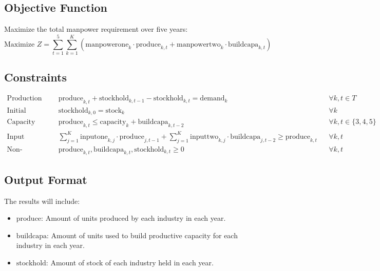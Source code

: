 \documentclass{article}
\begin{document}
\subsection*{Objective Function}
Maximize the total manpower requirement over five years:
\[
\text{Maximize } Z = \sum_{t=1}^{5} \sum_{k=1}^{K} \left( \text{manpowerone}_{k} \cdot \text{produce}_{k,t} + \text{manpowertwo}_{k} \cdot \text{buildcapa}_{k,t} \right)
\]

\subsection*{Constraints}
\begin{align*}
\text{Production Constraints:} & \quad \text{produce}_{k,t} + \text{stockhold}_{k,t-1} - \text{stockhold}_{k,t} = \text{demand}_{k} && \forall k, t \in T \\
\text{Initial Stock:} & \quad \text{stockhold}_{k,0} = \text{stock}_{k} && \forall k \\
\text{Capacity Constraints:} & \quad \text{produce}_{k,t} \leq \text{capacity}_{k} + \text{buildcapa}_{k,t-2} && \forall k, t \in \{3, 4, 5\} \\
\text{Input Constraints:} & \quad \sum_{j=1}^{K} \text{inputone}_{k,j} \cdot \text{produce}_{j,t-1} + \sum_{j=1}^{K} \text{inputtwo}_{k,j} \cdot \text{buildcapa}_{j,t-2} \geq \text{produce}_{k,t} && \forall k, t \\
\text{Non-negativity Constraints:} & \quad \text{produce}_{k,t}, \text{buildcapa}_{k,t}, \text{stockhold}_{k,t} \geq 0 && \forall k, t
\end{align*}

\subsection*{Output Format}
The results will include:
\begin{itemize}
    \item \( \text{produce} \): Amount of units produced by each industry in each year.
    \item \( \text{buildcapa} \): Amount of units used to build productive capacity for each industry in each year.
    \item \( \text{stockhold} \): Amount of stock of each industry held in each year.
\end{itemize}
\end{document}
